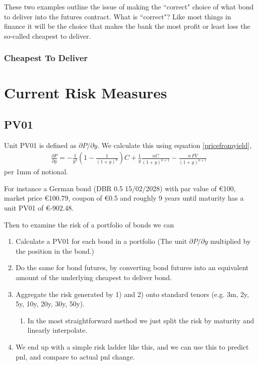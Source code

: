 \documentclass[12pt&a4paper]{article}
\numberwithin{equation}{section}
\begin{document}
These two examples outline the issue of making the ``correct" choice of what bond to deliver into the futures contract. What is ``correct"? Like most things in finance it will be the choice that makes the bank the most profit or least loss the so-called cheapest to deliver.



\subsubsection{Cheapest To Deliver}
 



\section{Current Risk Measures}
\subsection{PV01}
Unit PV01 is defined as $\partial P/\partial y$. We calculate this using equation \eqref{pricefromyield},
\begin{align*}
\frac{\partial P}{\partial y} = -\frac{1}{y^2}\left(1-\frac{1}{(1+y)^n}\right) C + \frac{1}{y} \frac{nC}{(1+y)^{n+1}} - \frac{n\, FV}{(1+y)^{n+1}}
\end{align*}
per 1mm of notional. 

For instance a German bond (DBR 0.5 15/02/2028) with par value of \euro100, market price \euro100.79, coupon of \euro0.5 and roughly 9 years until maturity has a unit PV01 of \euro-902.48. 


Then to examine the risk of a portfolio of bonds we can
\begin{enumerate}
	\item Calculate a PV01 for each bond in a portfolio (The unit $\partial P/\partial y$ multiplied by the position in the bond.)
	\item Do the same for bond futures, by converting bond futures into an equivalent amount of the underlying cheapest to deliver bond.
\item Aggregate the risk generated by 1) and 2) onto standard tenors (e.g. 3m, 2y, 5y, 10y, 20y, 30y, 50y).
\begin{enumerate}
	\item In the most straightforward method we just split the risk by maturity and linearly interpolate.
\end{enumerate}
	\item We end up with a simple risk ladder like this, and we can use this to predict pnl, and compare to actual pnl change.
\end{enumerate}
\end{document}
